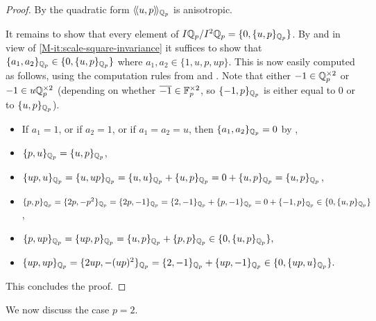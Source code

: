 \documentclass[12pt, leqno, british]{amsart}
\begin{document}
\begin{proof}
By  the quadratic form $\langle\!\langle u, p \rangle\!\rangle_{\mathbb Q_p}$ is anisotropic.

It remains to show that every element of $I\mathbb Q_p/I^2\mathbb Q_p = \lbrace 0, \lbrace u, p \rbrace_{\mathbb Q_p} \rbrace$.
By  and in view of \eqref{M-it:scale-square-invariance} it suffices to show that $\lbrace a_1, a_2 \rbrace_{\mathbb Q_p} \in \lbrace 0, \lbrace u, p \rbrace_{\mathbb Q_p} \rbrace$ where $a_1, a_2 \in \lbrace 1, u, p, up \rbrace$.
This is now easily computed as follows, using the computation rules from  and .
Note that either $-1 \in \mathbb Q_p^{\times 2}$ or $-1 \in u\mathbb Q_p^{\times 2}$ (depending on whether $\overline{-1} \in \mathbb F_p^{\times 2}$, so $\lbrace -1, p \rbrace_{\mathbb Q_p}$ is either equal to $0$ or to $\lbrace u, p \rbrace_{\mathbb Q_p}$).
\begin{itemize}
\item If $a_1 = 1$, or if $a_2 = 1$, or if $a_1 = a_2 = u$, then $\lbrace a_1, a_2 \rbrace_{\mathbb Q_p} = 0$ by ,
\item $\lbrace p, u \rbrace_{\mathbb Q_p} = \lbrace u, p \rbrace_{\mathbb Q_p}$,
\item $\lbrace up, u \rbrace_{\mathbb Q_p} = \lbrace u, up \rbrace_{\mathbb Q_p} = \lbrace u, u \rbrace_{\mathbb Q_p} + \lbrace u, p \rbrace_{\mathbb Q_p} = 0 + \lbrace u, p \rbrace_{\mathbb Q_p} = \lbrace u, p \rbrace_{\mathbb Q_p}$,
\item $\lbrace p, p \rbrace_{\mathbb Q_p} = \lbrace 2p, -p^2 \rbrace_{\mathbb Q_p} = \lbrace 2p, -1 \rbrace_{\mathbb Q_p} = \lbrace 2, -1 \rbrace_{\mathbb Q_p} + \lbrace p, -1 \rbrace_{\mathbb Q_p} = 0 + \lbrace -1, p \rbrace_{\mathbb Q_p} \in \lbrace 0, \lbrace u, p \rbrace_{\mathbb Q_p} \rbrace$,
\item $\lbrace p, up \rbrace_{\mathbb Q_p} = \lbrace up, p \rbrace_{\mathbb Q_p} = \lbrace u, p \rbrace_{\mathbb Q_p} + \lbrace p, p \rbrace_{\mathbb Q_p} \in \lbrace 0, \lbrace u, p \rbrace_{\mathbb Q_p} \rbrace,$
\item $\lbrace up, up \rbrace_{\mathbb Q_p} = \lbrace 2up, -(up)^2 \rbrace_{\mathbb Q_p} = \lbrace 2, -1 \rbrace_{\mathbb Q_p} + \lbrace up, -1 \rbrace_{\mathbb Q_p} \in \lbrace 0, \lbrace up, u \rbrace_{\mathbb Q_p} \rbrace.$
\end{itemize}
This concludes the proof.
\end{proof}
We now discuss the case $p=2$.
\end{document}
